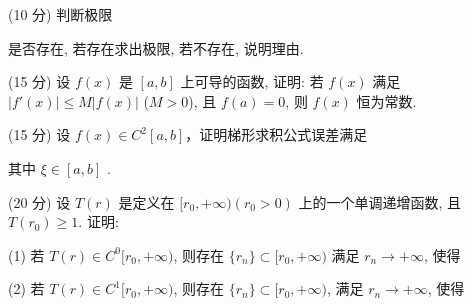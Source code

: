 \par{}
(10 分) 判断极限\par
\nopagebreak[4]
是否存在, 若存在求出极限, 若不存在, 说明理由.\par
(15 分) 设 $f(x)$ 是 $[a, b]$ 上可导的函数, 证明: 若 $f(x)$ 满足 $|f'(x)| \leq M |f(x)|$ ($M > 0$), 且 $f(a) = 0$, 则 $f(x)$ 恒为常数.\par
\par{}
(15 分) 设 $f(x) \in C^2[a, b]$，证明梯形求积公式误差满足\par
\nopagebreak[4]
其中  $\xi \in [a, b]$ .\par
(20 分) 设 $T(r)$ 是定义在 $[r_0, +\infty)(r_0 > 0)$ 上的一个单调递增函数, 且 $T(r_0) \geq 1$. 证明:\par
\par{}
(1) 若 $T(r) \in C^0[r_0, +\infty)$, 则存在 $\{r_n\} \subset [r_0, +\infty)$ 满足 $r_n \to +\infty$, 使得\par
\nopagebreak[4]
\par{}
(2) 若 $T(r) \in C^{1}[r_{0}, +\infty)$, 则存在 $\{r_{n}\} \subset [r_{0}, +\infty)$, 满足 $r_{n} \to +\infty$, 使得\par
\nopagebreak[4]
